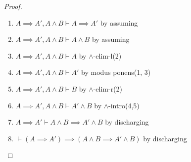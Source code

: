 \begin{proof}
\begin{enumerate}
\item $A\implies A', A\land B\vdash A\implies A'$ by assuming%
\item $A\implies A', A\land B\vdash A\land B$ by assuming%
\item $A\implies A', A\land B\vdash A$ by $\land$-elim-l(2)%
\item $A\implies A', A\land B\vdash A'$ by modus ponens(1, 3)%
\item $A\implies A', A\land B\vdash B$ by $\land$-elim-r(2)%
\item $A\implies A', A\land B\vdash A'\land B$ by $\land$-intro(4,5)%
\item $A\implies A'\vdash A\land B\implies A'\land B$ by discharging
\item $\vdash(A\implies A')\implies (A\land B\implies A'\land B)$ by discharging
\qedhere
\end{enumerate}
\end{proof}

